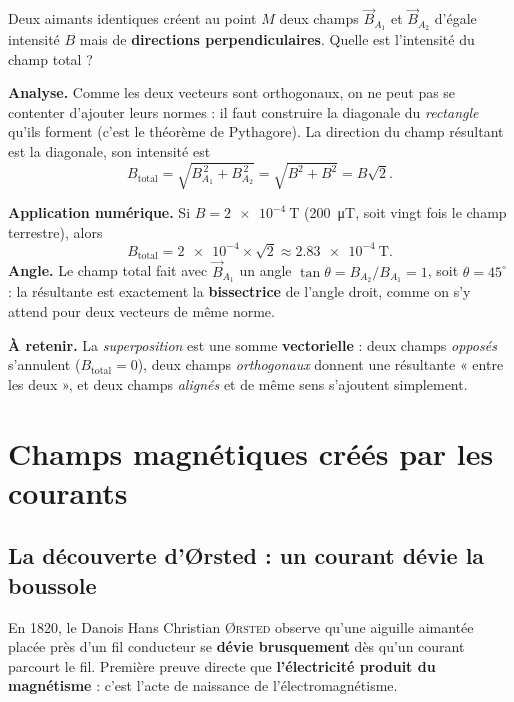 \documentclass[11pt,a4paper]{article}
\newcommand{\Bvec}{\vec{B}}
\begin{document}
\begin{exemple}
Deux aimants identiques créent au point $M$ deux champs $\Bvec_{A_1}$ et $\Bvec_{A_2}$ d'égale
intensité $B$ mais de \textbf{directions perpendiculaires}. Quelle est l'intensité du champ total ?

\smallskip
\textbf{Analyse.} Comme les deux vecteurs sont orthogonaux, on ne peut pas se contenter d'ajouter
leurs normes : il faut construire la diagonale du \emph{rectangle} qu'ils forment (c'est le théorème
de Pythagore). La direction du champ résultant est la diagonale, son intensité est
\[ B_{\text{total}} = \sqrt{B_{A_1}^{\,2}+B_{A_2}^{\,2}} = \sqrt{B^2+B^2} = B\sqrt{2}. \]

\textbf{Application numérique.} Si $B=\SI{2e-4}{\tesla}$ (\SI{200}{\micro\tesla}, soit vingt fois le
champ terrestre), alors
\[ B_{\text{total}} = \num{2e-4}\times\sqrt{2}\approx \SI{2.83e-4}{\tesla}. \]
\textbf{Angle.} Le champ total fait avec $\Bvec_{A_1}$ un angle
$\tan\theta = B_{A_2}/B_{A_1}=1$, soit $\theta=45^\circ$ : la résultante est exactement la
\textbf{bissectrice} de l'angle droit, comme on s'y attend pour deux vecteurs de même norme.

\textbf{À retenir.} La \emph{superposition} est une somme \textbf{vectorielle} : deux champs
\emph{opposés} s'annulent ($B_{\text{total}}=0$), deux champs \emph{orthogonaux} donnent une
résultante « entre les deux », et deux champs \emph{alignés} et de même sens s'ajoutent simplement.
\end{exemple}

\section{Champs magnétiques créés par les courants}

\subsection{La découverte d'Ørsted : un courant dévie la boussole}

En 1820, le Danois Hans Christian \textsc{Ørsted} observe qu'une aiguille aimantée placée près d'un
fil conducteur se \textbf{dévie brusquement} dès qu'un courant parcourt le fil. Première preuve
directe que \textbf{l'électricité produit du magnétisme} : c'est l'acte de naissance de
l'électromagnétisme.
\end{document}
